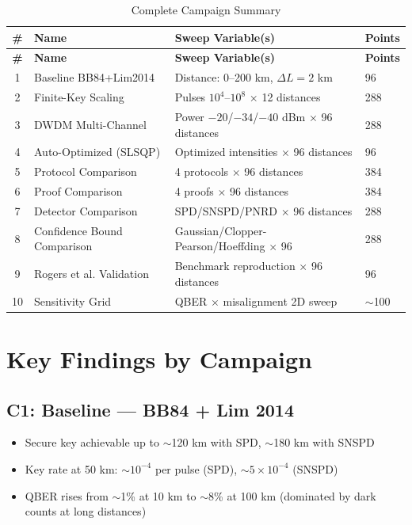 \documentclass[11pt,a4paper,oneside]{report}
\begin{document}
\begin{center}
\begin{longtable}{@{}cllp{4cm}@{}}
\caption{Complete Campaign Summary}\\
\toprule
\textbf{\#} & \textbf{Name} & \textbf{Sweep Variable(s)} & \textbf{Points} \\
\midrule
\endfirsthead
\toprule
\textbf{\#} & \textbf{Name} & \textbf{Sweep Variable(s)} & \textbf{Points} \\
\midrule
\endhead
1 & Baseline BB84+Lim2014 & Distance: 0–200 km, $\Delta L = 2$ km & 96 \\
2 & Finite-Key Scaling & Pulses $10^4$–$10^8$ $\times$ 12 distances & 288 \\
3 & DWDM Multi-Channel & Power $-20$/$-34$/$-40$ dBm $\times$ 96 distances & 288 \\
4 & Auto-Optimized (SLSQP) & Optimized intensities $\times$ 96 distances & 96 \\
5 & Protocol Comparison & 4 protocols $\times$ 96 distances & 384 \\
6 & Proof Comparison & 4 proofs $\times$ 96 distances & 384 \\
7 & Detector Comparison & SPD/SNSPD/PNRD $\times$ 96 distances & 288 \\
8 & Confidence Bound Comparison & Gaussian/Clopper-Pearson/Hoeffding $\times$ 96 & 288 \\
9 & Rogers et al. Validation & Benchmark reproduction $\times$ 96 distances & 96 \\
10 & Sensitivity Grid & QBER $\times$ misalignment 2D sweep & $\sim$100 \\
\bottomrule
\end{longtable}
\end{center}

\section{Key Findings by Campaign}

\subsection{C1: Baseline — BB84 + Lim 2014}
\begin{itemize}
\item Secure key achievable up to $\sim$120 km with SPD, $\sim$180 km with SNSPD
\item Key rate at 50 km: $\sim 10^{-4}$ per pulse (SPD), $\sim 5 \times 10^{-4}$ (SNSPD)
\item QBER rises from $\sim$1\% at 10 km to $\sim$8\% at 100 km (dominated by dark counts at long distances)
\end{itemize}
\end{document}
